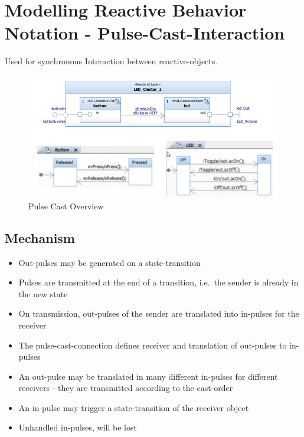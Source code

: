 \hypertarget{modelling-reactive-behavior-notation---pulse-cast-interaction}{%
\section{Modelling Reactive Behavior Notation -
Pulse-Cast-Interaction}\label{modelling-reactive-behavior-notation---pulse-cast-interaction}}

Used for synchronous Interaction between reactive-objects.

\begin{figure}[H]
\centering
\includegraphics[width=1\textwidth]{figures/pulseCastOverview.png}
\caption{Pulse Cast Overview}
\end{figure}

\hypertarget{mechanism}{%
\subsection{Mechanism}\label{mechanism}}

\begin{itemize}
\tightlist
\item
  Out-pulses may be generated on a state-transition
\item
  Pulses are transmitted at the end of a transition, i.e.~the sender is
  already in the new state
\item
  On transmission, out-pulses of the sender are translated into
  in-pulses for the receiver
\item
  The pulse-cast-connection defines receiver and translation of
  out-pulses to in-pulses
\item
  An out-pulse may be translated in many different in-pulses for
  different receivers - they are transmitted according to the cast-order
\item
  An in-pulse may trigger a state-transition of the receiver object
\item
  Unhandled in-pulses, will be lost
\end{itemize}

